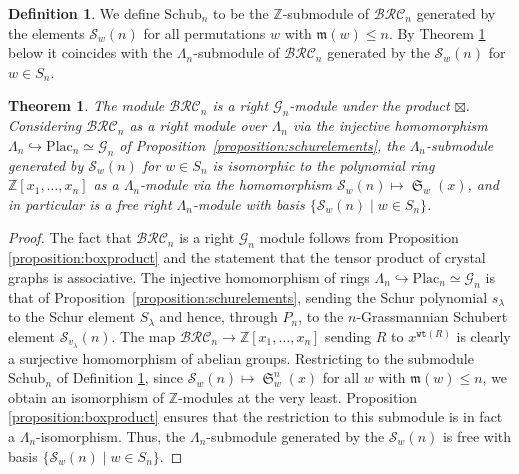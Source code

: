 \documentclass{amsart}
\newtheorem{theorem}{Theorem}[section]
\theoremstyle{definition}
\newtheorem{definition}[lemma]{Definition}
\theoremstyle{remark}
\numberwithin{equation}{subsection}
\DeclareMathOperator{\sch}{\mathfrak{S}}
\newcommand{\wtt}{\mathtt{wt}}
\newcommand{\grass}{\mathcal{G}}
\newcommand{\plac}{\mathrm{Plac}}
\newcommand{\BRC}{\mathcal{BRC}}
\newcommand{\maxd}{\mathfrak{m}}
\begin{document}
\begin{definition}\label{definition:schubn}
We define $\mathrm{Schub}_n$ to be the $\mathbb{Z}$-submodule of $\BRC_n$ generated by the elements $\mathcal{S}_w(n)$ for all permutations $w$ with $\maxd(w)\leq n$. By Theorem \ref{theorem:schubmoduleiso} below it coincides with the $\Lambda_n$-submodule of $\BRC_n$ generated by the $\mathcal{S}_w(n)$ for $w\in S_n$.
\end{definition}

\begin{theorem} \label{theorem:schubmoduleiso}
  The module $\BRC_n$ is a right $\grass_n$-module under the product $\boxtimes$. Considering $\BRC_n$ as a right module over $\Lambda_n$ via the injective homomorphism $\Lambda_n\hookrightarrow \plac_n\simeq \grass_n$ of Proposition~\ref{proposition:schurelements}, the $\Lambda_n$-submodule generated by $\mathcal{S}_w(n)$ for $w\in S_n$ is isomorphic to the polynomial ring $\mathbb{Z}[x_1,\ldots,x_n]$ as a $\Lambda_n$-module via the homomorphism $\mathcal{S}_w(n)\mapsto\sch_w(x)$, and in particular is a free right $\Lambda_n$-module with basis $\{\mathcal{S}_w(n)\mid w\in S_n\}$.
\end{theorem}
\begin{proof}
The fact that $\BRC_n$ is a right $\grass_n$ module follows from Proposition \ref{proposition:boxproduct} and the statement that the tensor product of crystal graphs is associative. The injective homomorphism of rings $\Lambda_n\hookrightarrow \plac_n\simeq \grass_n$ is that of Proposition~\ref{proposition:schurelements}, sending the Schur polynomial $s_\lambda$ to the Schur element $S_\lambda$ and hence, through $P_n$, to the $n$-Grassmannian Schubert element $\mathcal{S}_{v_\lambda}(n)$. The map $\BRC_n\to \mathbb{Z}[x_1,\ldots,x_n]$ sending $R$ to $x^{\wtt(R)}$ is clearly a surjective homomorphism of abelian groups. Restricting to the submodule $\mathrm{Schub}_n$ of Definition \ref{definition:schubn}, since $\mathcal{S}_w(n)\mapsto \sch_w^n(x)$ for all $w$ with $\maxd(w)\leq n$, we obtain an isomorphism of $\mathbb{Z}$-modules at the very least. Proposition \ref{proposition:boxproduct} ensures that the restriction to this submodule is in fact a $\Lambda_n$-isomorphism. Thus, the $\Lambda_n$-submodule generated by the $\mathcal{S}_w(n)$ is free with basis $\{\mathcal{S}_w(n)\mid w\in S_n\}$.
\end{proof}
\end{document}
